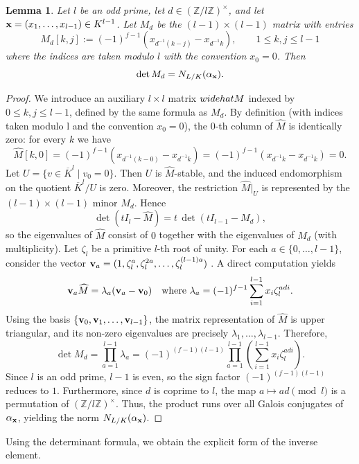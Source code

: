 \documentclass[a4paper, 11pt]{amsart}
\newcommand{\Z}{\mathbb Z}
\theoremstyle{plain}
\newtheorem{lem}[thm]{Lemma}
\theoremstyle{definition}
\numberwithin{equation}{section}
\begin{document}
\begin{lem}\label{lem:det-Md}
Let $l$ be an odd prime, let $d\in (\Z/l\Z)^\times$, and let ${\bf x}=(x_1,\dots,x_{l-1})\in K^{l-1}$.
Let $M_d$ be the $(l-1) \times (l-1)$ matrix with entries
\[
M_d[k,j]:=(-1)^{f-1}(x_{d^{-1}(k-j)}-x_{d^{-1}k}),\qquad 1\le k,j\le l-1
\]
where the indices are taken modulo $l$ with the convention $x_0=0$.
Then
\[
\det M_d = N_{L/K}(\alpha_{\bf x}).
\]
\end{lem}

\begin{proof}
We introduce an auxiliary $l \times l$ matrix $\\widehat{M}$ indexed by $0 \le k, j \le l-1$, defined by the same formula as $M_d$.
By definition (with indices taken modulo l and the convention $x_0 = 0$),
the $0$-th column of $\widehat{M}$ is identically zero: for every $k$ we have
\[
\widehat{M}[k,0]
= (-1)^{f-1}(x_{d^{-1}(k-0)}-x_{d^{-1}k})
= (-1)^{f-1}(x_{d^{-1}k}-x_{d^{-1}k})=0.
\]
Let $U=\{v\in \overline{K}^{l}\mid v_0=0\}$. Then $U$ is $\widehat M$-stable, and the induced endomorphism on the quotient $\overline{K}^{l}/U$ is zero. 
Moreover, the restriction $\widehat M|_U$ is represented by the $(l-1)\times(l-1)$ minor $M_d$. 
Hence
\[
\det(tI_{l}-\widehat M)=t\,\det(tI_{l-1}-M_d),
\]
so the eigenvalues of $\widehat M$ consist of $0$ together with the eigenvalues of $M_d$ (with multiplicity).
Let $\zeta_l$ be a primitive $l$-th root of unity. 
For each $a \in \{0, \dots, l-1\}$, consider the vector ${\bf v}_a = (1, \zeta_l^a, \zeta_l^{2a}, \dots, \zeta_l^{(l-1)a})$ .
A direct computation yields
\[
{\bf v}_a\widehat{M} = \lambda_a ({\bf v}_a - {\bf v}_0) \quad \text{where } \lambda_a = (-1)^{f-1} \sum_{i=1}^{l-1} x_i \zeta_l^{adi}.
\]
Using the basis $\{{\bf v}_0, {\bf v}_1, \dots, {\bf v}_{l-1}\}$, the matrix representation of $\widehat{M}$ is upper triangular, and its non-zero eigenvalues are precisely $\lambda_1, \dots, \lambda_{l-1}$.
Therefore,
\[
\det M_d = \prod_{a=1}^{l-1} \lambda_a = (-1)^{(f-1)(l-1)} \prod_{a=1}^{l-1} \left( \sum_{i=1}^{l-1} x_i \zeta_l^{adi} \right).
\]
Since $l$ is an odd prime, $l-1$ is even, so the sign factor $(-1)^{(f-1)(l-1)}$ reduces to $1$.
Furthermore, since $d$ is coprime to $l$, the map $a \mapsto ad \pmod l$ is a permutation of $(\Z/l\Z)^\times$. 
Thus, the product runs over all Galois conjugates of $\alpha_{\bf x}$, yielding the norm $N_{L/K}(\alpha_{\bf x})$.
\end{proof}

Using the determinant formula, we obtain the explicit form of the inverse element.
\end{document}
